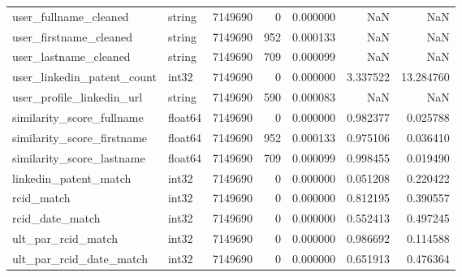 \documentclass{article}
\begin{document}
\begin{longtable}{llrrrrr}
user_fullname_cleaned & string & 7149690 & 0 & 0.000000 & NaN & NaN \\
user_firstname_cleaned & string & 7149690 & 952 & 0.000133 & NaN & NaN \\
user_lastname_cleaned & string & 7149690 & 709 & 0.000099 & NaN & NaN \\
user_linkedin_patent_count & int32 & 7149690 & 0 & 0.000000 & 3.337522 & 13.284760 \\
user_profile_linkedin_url & string & 7149690 & 590 & 0.000083 & NaN & NaN \\
similarity_score_fullname & float64 & 7149690 & 0 & 0.000000 & 0.982377 & 0.025788 \\
similarity_score_firstname & float64 & 7149690 & 952 & 0.000133 & 0.975106 & 0.036410 \\
similarity_score_lastname & float64 & 7149690 & 709 & 0.000099 & 0.998455 & 0.019490 \\
linkedin_patent_match & int32 & 7149690 & 0 & 0.000000 & 0.051208 & 0.220422 \\
rcid_match & int32 & 7149690 & 0 & 0.000000 & 0.812195 & 0.390557 \\
rcid_date_match & int32 & 7149690 & 0 & 0.000000 & 0.552413 & 0.497245 \\
ult_par_rcid_match & int32 & 7149690 & 0 & 0.000000 & 0.986692 & 0.114588 \\
ult_par_rcid_date_match & int32 & 7149690 & 0 & 0.000000 & 0.651913 & 0.476364 \\
\end{longtable}
\end{document}
